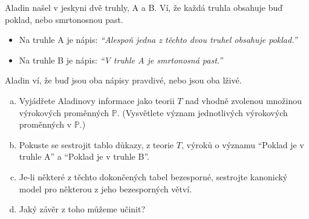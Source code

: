 \begin{problem}
    
    Aladin našel v jeskyni dvě truhly, A a B. Ví, že každá truhla obsahuje buď poklad, nebo smrtonosnou past.
    \begin{itemize}
    \item Na truhle A je nápis: {\it ``Alespoň jedna z těchto dvou truhel obsahuje poklad.''}
    \item Na truhle B je nápis: {\it ``V truhle A je smrtonosná past.''}
    \end{itemize}
    Aladin ví, že buď jsou oba nápisy pravdivé, nebo jsou oba lživé.
    \begin{enumerate}[(a)]
        \item Vyjádřete Aladinovy informace jako teorii $T$ nad vhodně zvolenou množinou výrokových proměnných $\mathbb P$. (Vysvětlete význam jednotlivých výrokových proměnných v $\mathbb P$.)
        \item Pokuste se sestrojit tablo důkazy, z teorie $T$, výroků o významu ``Poklad je v truhle A'' a ``Poklad je v truhle B''.
        \item Je-li některé z těchto dokončených tabel bezesporné, sestrojte kanonický model pro některou z jeho bezesporných větví.
        \item Jaký závěr z toho můžeme učinit?
    \end{enumerate}


\end{problem}
